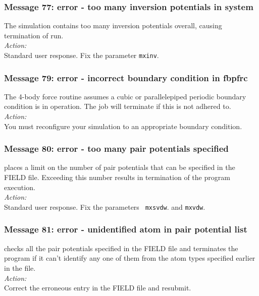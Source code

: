 \subsubsection*{Message 77: error - too many inversion
potentials  in system}

The simulation contains too many inversion potentials overall, causing
termination of run.\\

\noindent
{\em Action:}\\
Standard user response. Fix the parameter {\tt mxinv}.

\subsubsection*{Message 79: error - incorrect boundary
condition  in fbpfrc}

The 4-body  force routine assumes a
cubic  or parallelepiped  periodic
boundary condition is in operation. The job will terminate if this is
not adhered to.\\

\noindent
{\em Action:}\\
You must reconfigure your simulation to an appropriate boundary
condition.

\subsubsection*{Message 80: error - too many pair potentials specified}

\D{} places a limit on the number of pair potentials that can be
specified in the FIELD file. Exceeding this number results in
termination of the program execution. \\ 

\noindent
{\em Action:} \\Standard user response. Fix the parameters {\tt
 mxsvdw}. and {\tt mxvdw}.

\subsubsection*{Message 81: error - unidentified atom in pair potential list}

\D{} checks all the pair potentials specified in the FIELD file
and terminates the program if it can't identify any one of them from
the atom types specified earlier in the file. \\ 

\noindent
{\em Action:} \\ 
Correct the erroneous entry in the FIELD file and resubmit.

